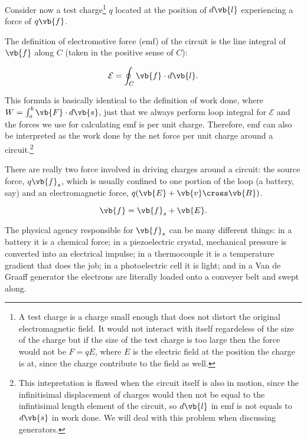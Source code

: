 \documentclass[english,a4paper,12pt]{report}
\begin{document}
Consider now a test charge\footnote{A test charge is a charge small enough that does not distort the original electromagnetic field. It would not interact with itself regardeless of the size of the charge but if the size of the test charge is too large then the force would not be \(F=qE\), where  \(E\) is the electric field at the position the charge is at, since the charge contribute to the field as well.} \(q\) located at the position of \(d \vb{l} \) experiencing a force of \(q \vb{f}\).

The definition of electromotive force (emf) of the circuit is the line integral of \(\vb{f} \) along \(C\) (taken in the positive sense of \(C\)):

\begin{equation}
    \mathcal{E} = \oint_{C}  \vb{f} \cdot d \vb{l} .
\end{equation}

This formula is basically identical to the definition of work done, where \(W = \int_{a}^{b} \vb{F} \cdot d \vb{s}  \), just that we always perform loop integral for \(\mathcal{E}\) and the forces we use for calculating emf is per unit charge. Therefore, emf can also be interpreted as the work done by the net force per unit charge around a circuit.\footnote{This intepretation is flawed when the circuit itself is also in motion, since the infinitisimal displacement of charges would then not be equal to the infintisimal length element of the circuit, so \(d \vb{l} \) in emf is not equals to \(d \vb{s} \) in work done. We will deal with this problem when discussing generators.}

There are really two force involved in driving charges around a circuit: the source force, \(q \vb{f} _{s}  \), which is usually confined to one portion of the loop (a battery, say) and an electromagnetic force, \(q(\vb{E} + \vb{v} \cross \vb{B} ) \).

\begin{equation}
    \vb{f} = \vb{f} _{s} + \vb{E} . 
\end{equation}

The physical agency responsible for \(\vb{f} _{s} \)  can be many different things: in a battery it is a chemical force; in a piezoelectric crystal, mechanical pressure is converted into an electrical impulse; in a thermocouple it is a temperature gradient that does the job; in a photoelectric cell it is light; and in a Van de Graaff generator the electrons are literally loaded onto a conveyer belt and swept along. 
\end{document}
